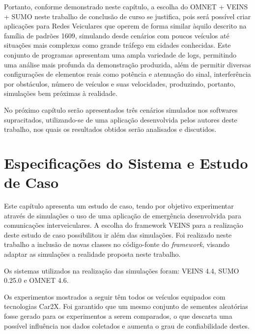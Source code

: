 \documentclass[
12pt,				%
openright,			%
oneside,			%
a4paper,			%
brazil,				%
]{abntex2}
\begin{document}
	\newpage
	
	\par Portanto, conforme demonstrado neste capítulo, a escolha do OMNET + VEINS + SUMO neste trabalho de conclusão de curso se justifica, pois será possível criar aplicações para Redes Veiculares que operem de forma similar àquilo descrito na família de padrões 1609, simulando desde cenários com poucos veículos até situações mais complexas como grande tráfego em cidades conhecidas. Este conjunto de programas apresentam uma ampla variedade de logs, permitindo uma análise mais profunda da demonstração produzida, além de permitir diversas configurações de elementos reais como potência e atenuação do sinal, interferência por obstáculos, número de veículos e suas velocidades, produzindo, portanto, simulações bem próximas à realidade.
	
	\par No próximo capítulo serão apresentados três cenários simulados nos softwares supracitados, utilizando-se de uma aplicação desenvolvida pelos autores deste trabalho, nos quais os resultados obtidos serão analisados e discutidos.


	\newpage
	\chapter{Especificações do Sistema e Estudo de Caso}

	\par Este capítulo apresenta um estudo de caso, tendo por objetivo experimentar através de simulações o uso de uma aplicação de emergência desenvolvida para comunicações interveiculares. A escolha do framework VEINS para a realização deste estudo de caso possibilitou ir além das simulações. Foi realizado neste trabalho a inclusão de novas classes no código-fonte do \textit{framework}, visando adaptar as simulações a realidade proposta neste trabalho.

	\par Os sistemas utilizados na realização das simulações foram: VEINS 4.4, SUMO 0.25.0 e OMNET 4.6.

	\par Os experimentos mostrados a seguir têm todos os veículos equipados com tecnologias Car2X. Foi garantido que um mesmo conjunto de sementes aleatórias fosse gerado para os experimentos a serem comparados, o que descarta uma possível influência nos dados coletados e aumenta o grau de confiabilidade destes.
\end{document}
